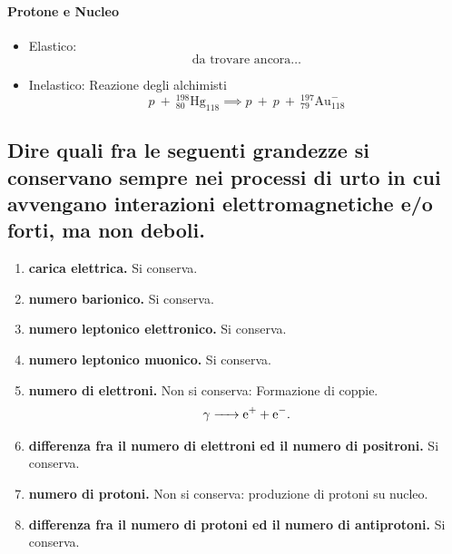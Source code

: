 \paragraph{Protone e Nucleo}
\begin{itemize}
	\item Elastico: 
	\[
		\text{da trovare ancora\ldots}
	\]
	\item Inelastico: Reazione degli alchimisti
	\[
		p \ + \ {}^{198}_{80}\text{Hg}_{118} \implies p \ + \ p \ + \ {}^{197}_{79}\text{Au}^{-}_{118} 
	\] 
\end{itemize}
\subsection[ Conservazione di alcune grandezze per interazioni elettromagnetiche/forti]{Dire quali fra le seguenti grandezze si conservano sempre nei processi di urto in cui avvengano interazioni elettromagnetiche e/o forti, ma non deboli.} 
\begin{enumerate}
	\item \textbf{carica elettrica.} Si conserva.
	\item \textbf{numero barionico.} Si conserva.
	\item \textbf{numero leptonico elettronico.} Si conserva. 
	\item \textbf{numero leptonico muonico.} Si conserva.
	\item \textbf{numero di elettroni.} Non si conserva: Formazione di coppie.
		\[
			\ce{ \ce{\gamma} -> \ce{e^+} + \ce{e^-}}
		.\]  
	\item \textbf{differenza fra il numero di elettroni ed il numero di positroni.} Si conserva.
	\item \textbf{numero di protoni.} Non si conserva: produzione di protoni su nucleo.
	\item \textbf{differenza fra il numero di protoni ed il numero di antiprotoni.} Si conserva.
\end{enumerate}


